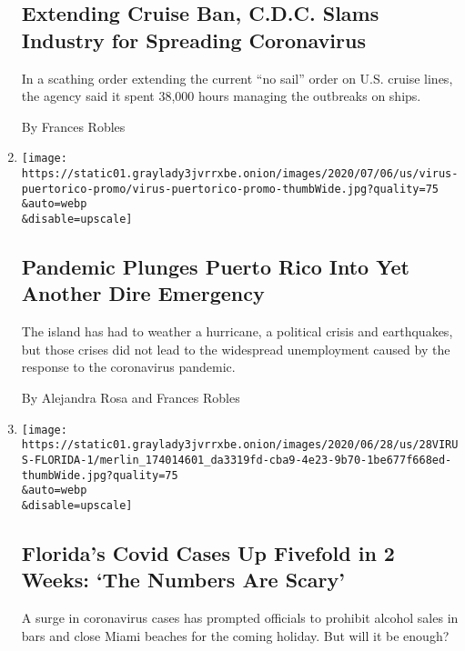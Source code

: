 \begin{enumerate}
{  \subsection{Extending Cruise Ban, C.D.C. Slams Industry for Spreading
  Coronavirus}\label{extending-cruise-ban-cdc-slams-industry-for-spreading-coronavirus}}

  In a scathing order extending the current ``no sail'' order on U.S.
  cruise lines, the agency said it spent 38,000 hours managing the
  outbreaks on ships.

  By Frances Robles
\item
  \href{/2020/07/08/us/coronavirus-puerto-rico-economy-unemployment.html}{}

  \texttt{[image: https://static01.graylady3jvrrxbe.onion/images/2020/07/06/us/virus-puertorico-promo/virus-puertorico-promo-thumbWide.jpg?quality=75\\\&auto=webp\\\&disable=upscale]}

  \hypertarget{pandemic-plunges-puerto-rico-into-yet-another-dire-emergency}{%
  \subsection{Pandemic Plunges Puerto Rico Into Yet Another Dire
  Emergency}\label{pandemic-plunges-puerto-rico-into-yet-another-dire-emergency}}

  The island has had to weather a hurricane, a political crisis and
  earthquakes, but those crises did not lead to the widespread
  unemployment caused by the response to the coronavirus pandemic.

  By Alejandra Rosa and Frances Robles
\item
  \href{/2020/06/28/us/coronavirus-florida-miami.html}{}

  \texttt{[image: https://static01.graylady3jvrrxbe.onion/images/2020/06/28/us/28VIRUS-FLORIDA-1/merlin\_174014601\_da3319fd-cba9-4e23-9b70-1be677f668ed-thumbWide.jpg?quality=75\\\&auto=webp\\\&disable=upscale]}

  \hypertarget{floridas-covid-cases-up-fivefold-in-2-weeks-the-numbers-are-scary}{%
  \subsection{Florida's Covid Cases Up Fivefold in 2 Weeks: `The Numbers
  Are
  Scary'}\label{floridas-covid-cases-up-fivefold-in-2-weeks-the-numbers-are-scary}}

  A surge in coronavirus cases has prompted officials to prohibit
  alcohol sales in bars and close Miami beaches for the coming holiday.
  But will it be enough?


\end{enumerate}
